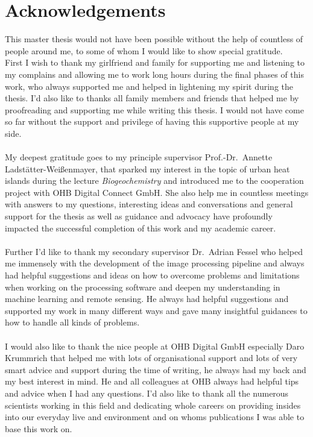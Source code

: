 \section*{Acknowledgements}
This master thesis would not have been possible without the help of countless of people around me, to some of whom I would like to show special gratitude. \\
%
First I wish to thank my girlfriend and family for supporting me and listening to my complains and allowing me to work long hours during the final phases of this work, who always supported me and helped in lightening my spirit during the thesis. 
I'd also like to thanks all family members and friends that helped me by proofreading and supporting me while writing this thesis.
I would not have come so far without the support and privilege of having this supportive people at my side.\\ \\
%
My deepest gratitude goes to my principle supervisor Prof.-Dr.~Annette Ladstätter-Weißenmayer, that sparked my interest in the topic of urban heat islands during the lecture \textit{Biogeochemistry} and introduced me to the cooperation project with OHB Digital Connect GmbH. 
She also help me in countless meetings with answers to my questions, interesting ideas and conversations and general support for the thesis as well as guidance and advocacy have profoundly impacted the successful completion of this work and my academic career.\\ \\
%
Further I'd like to thank my secondary supervisor Dr.\ Adrian Fessel who helped me immensely with the development of the image processing pipeline and always had helpful suggestions and ideas on how to overcome problems and limitations when working on the processing software and deepen my understanding in machine learning and remote sensing. 
He always had helpful suggestions and supported my work in many different ways and gave many insightful guidances to how to handle all kinds of problems.\\ \\
%
I would also like to thank the nice people at OHB Digital GmbH especially Daro Krummrich that helped me with lots of organisational support and lots of very smart advice and support during the time of writing, he always had my back and my best interest in mind. He and all colleagues at OHB always had helpful tips and advice when I had any questions.
%
I'd also like to thank all the numerous scientists working in this field and dedicating whole careers on providing insides into our everyday live and environment and on whoms publications I was able to base this work on. 
\newpage
